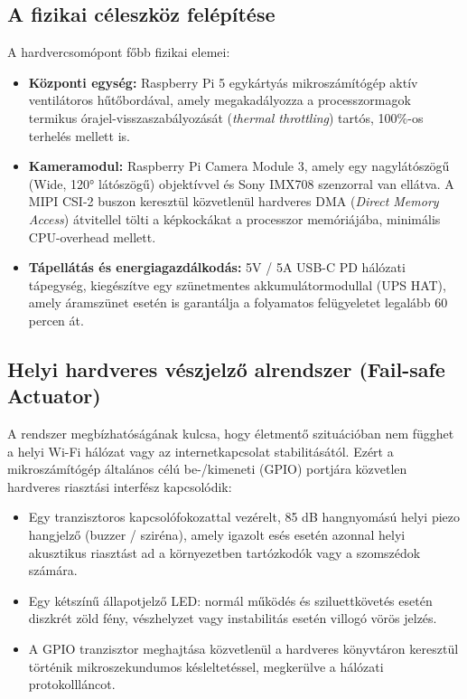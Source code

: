 \documentclass[12pt,a4paper,oneside]{report}
\begin{document}
\subsection{A fizikai céleszköz felépítése}
A hardvercsomópont főbb fizikai elemei:
\begin{itemize}
    \item \textbf{Központi egység:} Raspberry Pi 5 egykártyás mikroszámítógép aktív ventilátoros hűtőbordával, amely megakadályozza a processzormagok termikus órajel-visszaszabályozását (\textit{thermal throttling}) tartós, 100\%-os terhelés mellett is.
    \item \textbf{Kameramodul:} Raspberry Pi Camera Module 3, amely egy nagylátószögű (Wide, 120° látószögű) objektívvel és Sony IMX708 szenzorral van ellátva. A MIPI CSI-2 buszon keresztül közvetlenül hardveres DMA (\textit{Direct Memory Access}) átvitellel tölti a képkockákat a processzor memóriájába, minimális CPU-overhead mellett.
    \item \textbf{Tápellátás és energiagazdálkodás:} 5V / 5A USB-C PD hálózati tápegység, kiegészítve egy szünetmentes akkumulátormodullal (UPS HAT), amely áramszünet esetén is garantálja a folyamatos felügyeletet legalább 60 percen át.
\end{itemize}

\subsection{Helyi hardveres vészjelző alrendszer (Fail-safe Actuator)}
A rendszer megbízhatóságának kulcsa, hogy életmentő szituációban nem függhet a helyi Wi-Fi hálózat vagy az internetkapcsolat stabilitásától. Ezért a mikroszámítógép általános célú be-/kimeneti (GPIO) portjára közvetlen hardveres riasztási interfész kapcsolódik:
\begin{itemize}
    \item Egy tranzisztoros kapcsolófokozattal vezérelt, 85 dB hangnyomású helyi piezo hangjelző (buzzer / sziréna), amely igazolt esés esetén azonnal helyi akusztikus riasztást ad a környezetben tartózkodók vagy a szomszédok számára.
    \item Egy kétszínű állapotjelző LED: normál működés és sziluettkövetés esetén diszkrét zöld fény, vészhelyzet vagy instabilitás esetén villogó vörös jelzés.
    \item A GPIO tranzisztor meghajtása közvetlenül a hardveres könyvtáron keresztül történik mikroszekundumos késleltetéssel, megkerülve a hálózati protokollláncot.
\end{itemize}
\end{document}
